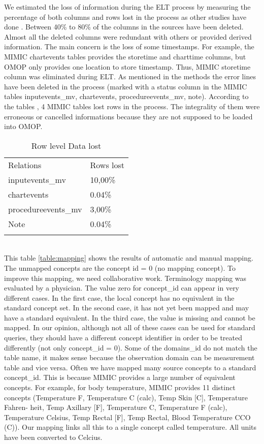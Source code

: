%
%
We estimated the loss of information during the ELT process by measuring the
percentage of both columns and rows lost in the process as other studies have
done \cite{omop-nashville}.
Between 40\% to 80\% of the columns in the sources have been deleted. Almost
all the deleted columns were redundant with others or provided derived
information. The main concern is the loss of some timestamps. For example, the
MIMIC chartevents tables provides the storetime and charttime columns, but OMOP
only provides one location to store timestamp. Thus, MIMIC storetime column was
eliminated during ELT. As mentioned in the methods the error lines have been
deleted in the process (marked with a status column in the MIMIC tables
inputevents\_mv, chartevents, procedureevents\_mv, note).
According to the tables \cite{lostrows}, 4 MIMIC tables lost rows in the
process. The integrality of them were erroneous or cancelled informations
because they are not supposed to be loaded into OMOP.

\begin{table*}[t]
\caption{Row level Data lost}{
\begin{tabular}{@{}ll@{}}\toprule
Relations           & Rows lost        \\\colrule
inputevents\_mv     & 10,00\%          \\
chartevents         & 0.04\%           \\
procedureevents\_mv & 3,00\%           \\
Note                & 0.04\%           \\\botrule
\end{tabular}}
\label{table:lostrows}
\end{table*}
~
\\

This table \ref{table:mapping} shows the results of automatic and manual mapping. 
The unmapped concepts are the concept id = 0 (no mapping concept). 
To improve this mapping, we need collaborative work. Terminology mapping was 
evaluated by a physician. The value zero for concept\_id can appear in very 
different cases. In the first case, the local concept has no equivalent in the 
standard concept set. In the second case, it has not yet been mapped and may 
have a standard equivalent. In the third case, the value is missing and cannot 
be mapped. In our opinion, although not all of these cases can be used for 
standard queries, they should have a different concept identifier in order to be 
treated differently (not only concept\_id = 0). Some of the domains\_id do not 
match the table name, it makes sense because the observation domain can be 
measurement table and vice versa.
Often we have mapped many source concepts to a standard concept\_id. This is 
because MIMIC provides a large number of equivalent concepts. For example, 
for body temperature, MIMIC provides 11 distinct concepts (Temperature F, 
Temperature C (calc), Temp Skin [C], Temperature Fahren- heit, Temp Axillary [F], 
Temperature C, Temperature F (calc), Temperature Celsius, Temp Rectal [F], 
Temp Rectal, Blood Temperature CCO (C)). Our mapping links all this to a single 
concept called temperature. All units have been converted to Celcius.

